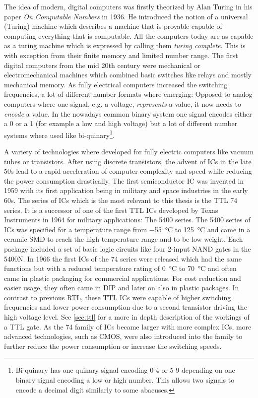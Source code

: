 The idea of modern, digital computers was firstly theorized by Alan Turing in his paper \emph{On Computable Numbers} in 1936. \cite{10.1112/plms/s2-42.1.230}
He introduced the notion of a universal (Turing) machine which describes a machine that is provable capable of computing everything that is computable.
All the computers today are as capable as a turing machine which is expressed by calling them \emph{turing complete}.
This is with exception from their finite memory and limited number range.
The first digital computers from the mid 20th century were mechanical or electromechanical machines which combined basic switches like relays and mostly mechanical memory.
As fully electrical computers increased the switching frequencies, a lot of different number formats where emerging:
Opposed to analog computers where one signal, e.g. a voltage, \emph{represents} a value, it now needs to \emph{encode} a value.
In the nowadays common binary system one signal encodes either a 0 or a 1 (for example a low and high voltage) but a lot of different number systems where used like bi-quinary\footnote{Bi-quinary has one quinary signal encoding 0-4 or 5-9 depending on one binary signal encoding a low or high number. This allows two signals to encode a decimal digit similarly to some abacuses.}.

A variety of technologies where developed for fully electric computers like vacuum tubes or transistors.
After using discrete transistors, the advent of \glspl{IC} in the late 50s lead to a rapid acceleration of computer complexity and speed while reducing the power consumption drastically.
The first semiconductor \gls{IC} was invented in 1959 \cite[p. 221]{winston1998media} with its first application being in military and space industries in the early 60s.
The series of \glspl{IC} which is the most relevant to this thesis is the \gls{TTL} 74 series.
It is a successor of one of the first \gls{TTL} \glspl{IC} developed by Texas Instruments in 1964 for military applications: The 5400 series. \cite{ICs}
The 5400 series of \glspl{IC} was specified for a temperature range from \qty{-55}{\celsius} to \qty{+125}{\celsius} and came in a ceramic \gls{SMD} to reach the high temperature range and to be low weight.
Each package included a set of basic logic circuits like four 2-input NAND gates in the 5400N.
In 1966 the first \glspl{IC} of the 74 series were released which had the same functions but with a reduced temperature rating of \qty{0}{\celsius} to \qty{+70}{\celsius} and often came in plastic packaging for commercial applications.
For cost reduction and easier usage, they often came in \gls{DIP} and later on also in plastic packages.
In contrast to previous \gls{RTL}, these \gls{TTL} \glspl{IC} were capable of higher switching frequencies and lower power consumption due to a second transistor driving the high voltage level.
See \cref{sec:ttl} for a more in depth description of the workings of a \gls{TTL} gate.
As the 74 family of \glspl{IC} became larger with more complex \glspl{IC}, more advanced technologies, such as \gls{CMOS}, were also introduced into the family to further reduce the power consumption or increase the switching speeds.

